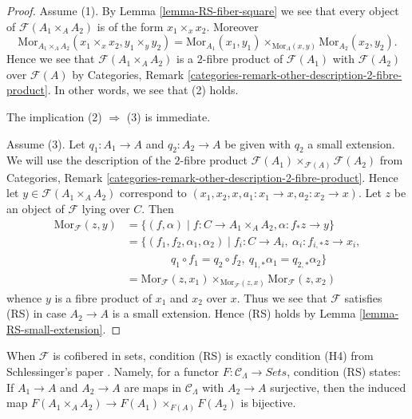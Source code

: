 \begin{proof}
Assume (1). By
Lemma \ref{lemma-RS-fiber-square}
we see that every object of $\mathcal{F}(A_1 \times_A A_2)$
is of the form $x_1 \times_x x_2$. Moreover
$$
\text{Mor}_{A_1 \times_A A_2}(x_1 \times_x x_2, y_1 \times_y y_2) =
\text{Mor}_{A_1}(x_1, y_1) \times_{\text{Mor}_A(x, y)}
\text{Mor}_{A_2}(x_2, y_2).
$$
Hence we see that $\mathcal{F}(A_1 \times_A A_2)$ is a $2$-fibre product
of $\mathcal{F}(A_1)$ with $\mathcal{F}(A_2)$ over $\mathcal{F}(A)$ by
Categories, Remark \ref{categories-remark-other-description-2-fibre-product}.
In other words, we see that (2) holds.

\medskip\noindent
The implication (2) $\Rightarrow$ (3) is immediate.

\medskip\noindent
Assume (3). Let $q_1 : A_1 \to A$ and $q_2 : A_2 \to A$ be given with
$q_2$ a small extension. We will use the description of the $2$-fibre product
$\mathcal{F}(A_1) \times_{\mathcal{F}(A)} \mathcal{F}(A_2)$ from
Categories, Remark \ref{categories-remark-other-description-2-fibre-product}.
Hence let $y \in \mathcal{F}(A_1 \times_A A_2)$ correspond to
$(x_1, x_2, x, a_1 : x_1 \to x, a_2 : x_2 \to x)$.
Let $z$ be an object of $\mathcal{F}$ lying over $C$. Then
\begin{align*}
\text{Mor}_\mathcal{F}(z, y) & =
\{(f, \alpha) \mid f : C \to A_1 \times_A A_2,
\alpha : f_*z \to y\} \\
& = \{(f_1, f_2, \alpha_1, \alpha_2) \mid
f_i : C \to A_i,\ \alpha_i : f_{i, *}z \to x_i, \\
& \quad\quad\quad\quad
q_1 \circ f_1 = q_2 \circ f_2,\ q_{1, *} \alpha_1 = q_{2, *}\alpha_2\} \\
& =
\text{Mor}_\mathcal{F}(z, x_1) \times_{\text{Mor}_\mathcal{F}(z, x)}
\text{Mor}_\mathcal{F}(z, x_2)
\end{align*}
whence $y$ is a fibre product of $x_1$ and $x_2$ over $x$. Thus we see
that $\mathcal{F}$ satisfies (RS) in case $A_2 \to A$ is a small extension.
Hence (RS) holds by
Lemma \ref{lemma-RS-small-extension}.
\end{proof}

\begin{remark}
\label{remark-compare-schlessinger-H4}
When $\mathcal{F}$ is cofibered in sets, condition (RS) is exactly condition 
(H4) from Schlessinger's paper \cite[Theorem 2.11]{Sch}.  Namely, for 
a functor $F: \mathcal{C}_\Lambda \to \textit{Sets}$, condition 
(RS) states: If $A_1 \to A$ and $A_2 \to A$ are maps in 
$\mathcal{C}_\Lambda$ with $A_2 \to A$ surjective, then the induced 
map $F(A_1 \times_{A} A_2) \to F(A_1) \times_{F(A)} F(A_2)$ is 
bijective.
\end{remark}

